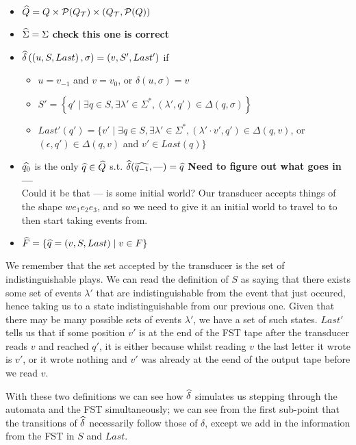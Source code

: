 \documentclass[12pt, a4paper]{article} %
\begin{document}
\begin{itemize}
    \item $\widehat{Q} = Q \times \mathcal{P}(Q_{\mathcal{T}}) \times (Q_{\mathcal{T}}, \mathcal{P}(Q))$
    \item $\widehat{\Sigma} = \Sigma$ \textbf{check this one is correct}
    \item $\widehat{\delta}\left(\left(u, S, Last\right), \sigma\right) = \left(v, S', Last'\right)$ if
    \begin{itemize}
        \item $u = v_{-1}$ and $v = v_0$, or $\delta\left(u, \sigma\right) = v$
        \item $S' = \left\{q' \mid \exists q \in S, \exists \lambda' \in \Sigma^\ast, \left(\lambda', q'\right) \in \Delta(q, \sigma)\right\}$
        \item $Last'(q') = \{v' \mid \exists q \in S , \exists \lambda' \in \Sigma^\ast, (\lambda' \cdot v', q') \in \Delta(q, v) $, or  $(\epsilon, q') \in \Delta(q, v)$ and $v' \in Last(q)\}$
    \end{itemize}
    \item $\widehat{q_0}$ is the only $\widehat{q} \in \widehat{Q}$ s.t. $\widehat{\delta}(\widehat{q_{-1}}, \text{---}) = \widehat{q}$ \textbf{Need to figure out what goes in ---} \\
    Could it be that --- is some initial world? Our transducer accepts things of the shape $we_1e_2e_3$, and so we need to give it an initial world to travel to to then start taking events from. 
    \item $\widehat{F} = \left\{\widehat{q} = (v, S, Last) \mid v \in F\right\}$
\end{itemize}

We remember that the set accepted by the transducer is the set of indistinguishable plays. We can read the definition of $S$ as saying that there exists some set of events $\lambda'$ that are indistinguishable from the event that just occured, hence taking us to a state indistinguishable from our previous one. Given that there may be many possible sets of events $\lambda'$, we have a set of such states. $Last'$ tells us that if some position $v'$ is at the end of the FST tape after the transducer reads $v$ and reached $q'$, it is either because whilst reading $v$ the last letter it wrote is $v'$, or it wrote nothing and $v'$ was already at the eend of the output tape before we read $v$. 

With these two definitions we can see how $\widehat{\delta}$ simulates us stepping through the automata and the FST simultaneously; we can see from the first sub-point that the transitions of $\widehat{\delta}$ necessarily follow those of $\delta$, except we add in the information from the FST in $S$ and $Last$.
\end{document}
